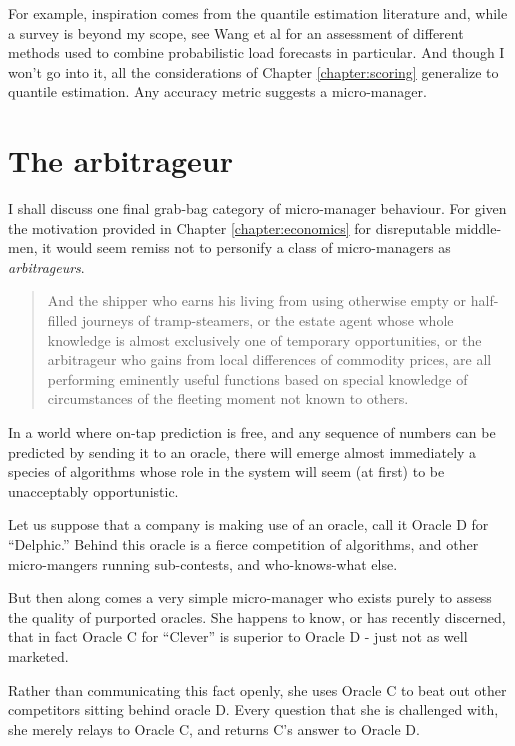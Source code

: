 For example, inspiration comes from the quantile estimation literature and, while a survey is beyond my scope, see Wang et al for an assessment of different methods used to combine probabilistic load forecasts in particular. And though I won't go into it, all the considerations of Chapter \ref{chapter:scoring} generalize to quantile estimation. Any accuracy metric suggests a micro-manager. 

\section{The arbitrageur}

I shall discuss one final grab-bag category of micro-manager behaviour. For given the motivation provided in Chapter \ref{chapter:economics} for disreputable middle-men, it would seem remiss not to personify a class of micro-managers as {\em arbitrageurs}. 

\begin{quote}{\cite{Hayek1945TheHayek}}
And the shipper who earns his living from using otherwise empty or half-filled journeys of tramp-steamers, or the estate agent whose whole knowledge is almost exclusively one of temporary opportunities, or the arbitrageur who gains from local differences of commodity prices, are all performing eminently useful functions based on special knowledge of circumstances of the fleeting moment not known to others.
\end{quote}

In a world where on-tap prediction is free, and any sequence of numbers can be predicted by sending it to an oracle, there will emerge almost immediately a species of algorithms whose role in the system will seem (at first) to be unacceptably opportunistic.  

Let us suppose that a company is making use of an oracle, call it Oracle D for ``Delphic.'' Behind this oracle is a fierce competition of algorithms, and other micro-mangers running sub-contests, and who-knows-what else. 

But then along comes a very simple micro-manager who exists purely to assess the quality of purported oracles. She happens to know, or has recently discerned, that in fact Oracle C for ``Clever'' is superior to Oracle D - just not as well marketed. 


Rather than communicating this fact openly, she uses Oracle C to beat out other competitors sitting behind oracle D. Every question that she is challenged with, she merely relays to Oracle C, and returns C's answer to Oracle D. 


